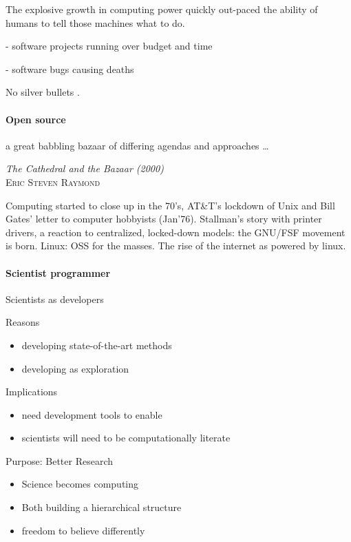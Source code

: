 \documentclass[ChapterTOCs,krantz2]{krantz} %
\begin{document}
The explosive growth in computing power quickly out-paced the ability
of humans to tell those machines what to do.

- software projects running over budget and time

- software bugs causing deaths

No silver bullets \cite{brooks1995mythical}.

\paragraph{ {\bf Open source}}

\setlength{\epigraphrule}{0pt}
\setlength{\epigraphwidth}{.65\textwidth}
\epigraph%
{%
  a great babbling bazaar of differing agendas and approaches \ldots
}%
{\textit{The Cathedral and the Bazaar (2000)}\\ \textsc{Eric Steven Raymond} }

Computing started to close up in the 70's, AT\&T's lockdown of Unix
and Bill Gates' letter to computer hobbyists (Jan'76). Stallman's
story with printer drivers, a reaction to centralized, locked-down
models: the GNU/FSF movement is born. Linux: OSS for the masses. The
rise of the internet as powered by linux.


\paragraph{ {\bf Scientist programmer}}

Scientists as developers

Reasons

\begin{itemize}
\item  developing state-of-the-art methods
\item developing as exploration
\end{itemize}

Implications

\begin{itemize}
\item need development tools to enable
\item scientists will need to be computationally literate
\end{itemize}

Purpose:  Better Research

\begin{itemize}
\item Science becomes computing
\item Both building a hierarchical structure
\item freedom to believe differently
\end{itemize}
\end{document}
